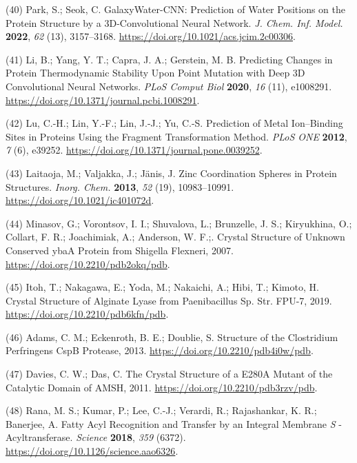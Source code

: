 \documentclass[ lineno,
  9pt]{elife}
\newenvironment{cslreferences}%
  {}%
  {\par}
\begin{document}
\begin{cslreferences}
\leavevmode\hypertarget{ref-9UNjBvCL}{}%
(40) Park, S.; Seok, C. GalaxyWater-CNN: Prediction of Water Positions on the Protein Structure by a 3D-Convolutional Neural Network. \emph{J. Chem. Inf. Model.} \textbf{2022}, \emph{62} (13), 3157--3168. \url{https://doi.org/10.1021/acs.jcim.2c00306}.

\leavevmode\hypertarget{ref-9K88m3YT}{}%
(41) Li, B.; Yang, Y. T.; Capra, J. A.; Gerstein, M. B. Predicting Changes in Protein Thermodynamic Stability Upon Point Mutation with Deep 3D Convolutional Neural Networks. \emph{PLoS Comput Biol} \textbf{2020}, \emph{16} (11), e1008291. \url{https://doi.org/10.1371/journal.pcbi.1008291}.

\leavevmode\hypertarget{ref-k859wJxx}{}%
(42) Lu, C.-H.; Lin, Y.-F.; Lin, J.-J.; Yu, C.-S. Prediction of Metal Ion--Binding Sites in Proteins Using the Fragment Transformation Method. \emph{PLoS ONE} \textbf{2012}, \emph{7} (6), e39252. \url{https://doi.org/10.1371/journal.pone.0039252}.

\leavevmode\hypertarget{ref-Wt0ducot}{}%
(43) Laitaoja, M.; Valjakka, J.; Jänis, J. Zinc Coordination Spheres in Protein Structures. \emph{Inorg. Chem.} \textbf{2013}, \emph{52} (19), 10983--10991. \url{https://doi.org/10.1021/ic401072d}.

\leavevmode\hypertarget{ref-Qubi5dZD}{}%
(44) Minasov, G.; Vorontsov, I. I.; Shuvalova, L.; Brunzelle, J. S.; Kiryukhina, O.; Collart, F. R.; Joachimiak, A.; Anderson, W. F.;. Crystal Structure of Unknown Conserved ybaA Protein from Shigella Flexneri, 2007. \url{https://doi.org/10.2210/pdb2okq/pdb}.

\leavevmode\hypertarget{ref-g7lHXZp5}{}%
(45) Itoh, T.; Nakagawa, E.; Yoda, M.; Nakaichi, A.; Hibi, T.; Kimoto, H. Crystal Structure of Alginate Lyase from Paenibacillus Sp. Str. FPU-7, 2019. \url{https://doi.org/10.2210/pdb6kfn/pdb}.

\leavevmode\hypertarget{ref-w9ECLZDp}{}%
(46) Adams, C. M.; Eckenroth, B. E.; Doublie, S. Structure of the Clostridium Perfringens CspB Protease, 2013. \url{https://doi.org/10.2210/pdb4i0w/pdb}.

\leavevmode\hypertarget{ref-wW700ShK}{}%
(47) Davies, C. W.; Das, C. The Crystal Structure of a E280A Mutant of the Catalytic Domain of AMSH, 2011. \url{https://doi.org/10.2210/pdb3rzv/pdb}.

\leavevmode\hypertarget{ref-RFwEiPTW}{}%
(48) Rana, M. S.; Kumar, P.; Lee, C.-J.; Verardi, R.; Rajashankar, K. R.; Banerjee, A. Fatty Acyl Recognition and Transfer by an Integral Membrane \emph{S} -Acyltransferase. \emph{Science} \textbf{2018}, \emph{359} (6372). \url{https://doi.org/10.1126/science.aao6326}.


\end{cslreferences}
\end{document}
